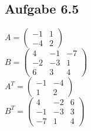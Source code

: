 \documentclass{standalone}
\begin{document}
\subsection{Aufgabe 6.5}

\begin{multicols}{2}
	
	\noindent$A =
	\begin{pmatrix}
		-1 & 1\\
		-4 & 2
	\end{pmatrix}
	$\\
	
	\noindent$B =
	\begin{pmatrix}
		4 & -1 & -7\\
		-2 & -3 &  1\\
		6 &  3 &  4
	\end{pmatrix}
	$\\
	
	$A^T =
	\begin{pmatrix}
		-1 & -4\\
		1 &  2
	\end{pmatrix}
	$\\
	
	$B^T =
	\begin{pmatrix}
		4 & -2 &  6\\
		-1 & -3 &  3\\
		-7 &  1 &  4
	\end{pmatrix}
	$\\
	
\end{multicols}
\end{document}
